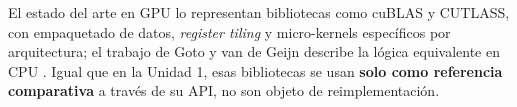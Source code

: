 	El estado del arte en GPU lo representan bibliotecas como cuBLAS y CUTLASS, con empaquetado de datos, \textit{register tiling} y micro-kernels específicos por arquitectura; el trabajo de Goto y van de Geijn describe la lógica equivalente en CPU \cite{goto2008}. Igual que en la Unidad 1, esas bibliotecas se usan \textbf{solo como referencia comparativa} a través de su API, no son objeto de reimplementación.
